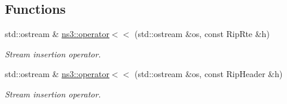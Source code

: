 \subsection*{Functions}
\begin{DoxyCompactItemize}
\item 
std\+::ostream \& \hyperlink{namespacens3_a701b08070ee0aca7658ed2c083bc71bc}{ns3\+::operator$<$$<$} (std\+::ostream \&os, const Rip\+Rte \&h)
\begin{DoxyCompactList}\small\item\em Stream insertion operator. \end{DoxyCompactList}\item 
std\+::ostream \& \hyperlink{namespacens3_aaf537f7624cfcbe056d3ebc47019b1d1}{ns3\+::operator$<$$<$} (std\+::ostream \&os, const Rip\+Header \&h)
\begin{DoxyCompactList}\small\item\em Stream insertion operator. \end{DoxyCompactList}\end{DoxyCompactItemize}
